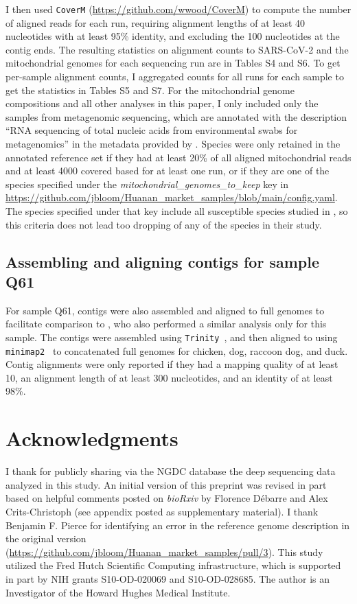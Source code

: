 \documentclass[9pt,twocolumn,twoside]{gsajnl_modified}
\begin{document}
{I then used \texttt{CoverM} (\url{https://github.com/wwood/CoverM}) to compute the number of aligned reads for each run, requiring alignment lengths of at least 40 nucleotides with at least 95\% identity, and excluding the 100 nucleotides at the contig ends.
The resulting statistics on alignment counts to SARS-CoV-2 and the mitochondrial genomes for each sequencing run are in Tables S4 and S6.
To get per-sample alignment counts, I aggregated counts for all runs for each sample to get the statistics in Tables S5 and S7.
For the mitochondrial genome compositions and all other analyses in this paper, I only included only the samples from metagenomic sequencing, which are annotated with the description ``RNA sequencing of total nucleic acids from environmental swabs for metagenomics'' in the metadata provided by \citet{liu2023surveillance}.
Species were only retained in the annotated reference set if they had at least 20\% of all aligned mitochondrial reads and at least 4000 covered based for at least one run, or if they are one of the species specified under the \textit{mitochondrial\_genomes\_to\_keep} key in \url{https://github.com/jbloom/Huanan_market_samples/blob/main/config.yaml}.
The species specified under that key include all susceptible species studied in \citet{crits2023genetic}, so this criteria does not lead too dropping of any of the species in their study.

\subsection{Assembling and aligning contigs for sample Q61}
For sample Q61, contigs were also assembled and aligned to full genomes to facilitate comparison to \citet{crits2023genetic}, who also performed a similar analysis only for this sample.
The contigs were assembled using \texttt{Trinity}~\citep{grabherr2011trinity}, and then aligned to using \texttt{minimap2}~\citep{li2018minimap2} to concatenated full genomes for chicken, dog, raccoon dog, and duck.
Contig alignments were only reported if they had a mapping quality of at least 10, an alignment length of at least 300 nucleotides, and an identity of at least 98\%.

\section{Acknowledgments}
I thank \citet{liu2023surveillance} for publicly sharing via the NGDC database the deep sequencing data analyzed in this study.
An initial version of this preprint was revised in part based on helpful comments posted on \textit{bioRxiv} by Florence Débarre and Alex Crits-Christoph (see appendix posted as supplementary material).
I thank Benjamin F. Pierce for identifying an error in the reference genome description in the original version (\url{https://github.com/jbloom/Huanan_market_samples/pull/3}).
This study utilized the Fred Hutch Scientific Computing infrastructure, which is supported in part by NIH grants S10-OD-020069 and S10-OD-028685.
The author is an Investigator of the Howard Hughes Medical Institute.

}
\end{document}
